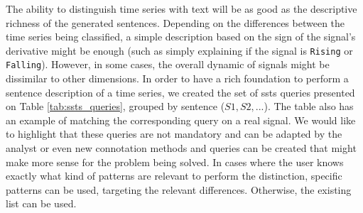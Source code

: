 The ability to distinguish time series with text will be as good as the descriptive richness of the generated sentences. Depending on the differences between the time series being classified, a simple description based on the sign of the signal's derivative might be enough (such as simply explaining if the signal is \texttt{Rising} or \texttt{Falling}). However, in some cases, the overall dynamic of signals might be dissimilar to other dimensions. In order to have a rich foundation to perform a sentence description of a time series, we created the set of \gls{ssts} queries presented on Table \ref{tab:ssts_queries}, grouped by sentence ($S1, S2, ...$). The table also has an example of matching the corresponding query on a real signal. We would like to highlight that these queries are not mandatory and can be adapted by the analyst or even new connotation methods and queries can be created that might make more sense for the problem being solved. In cases where the user knows exactly what kind of patterns are relevant to perform the distinction, specific patterns can be used, targeting the relevant differences. Otherwise, the existing list can be used.

